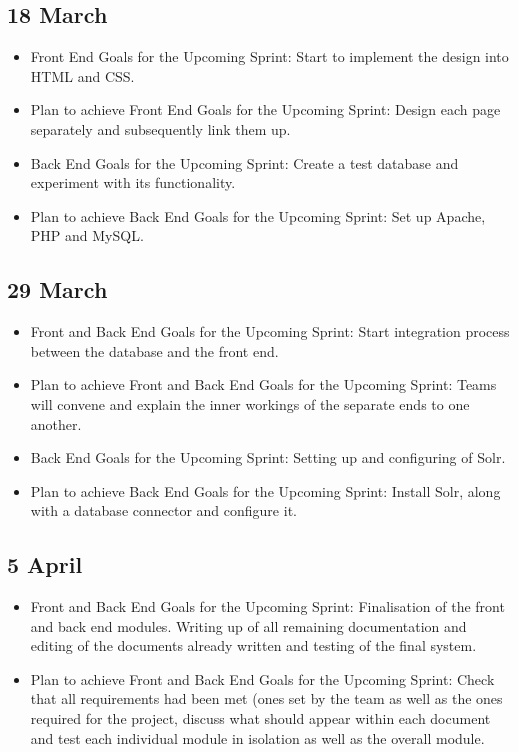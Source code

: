 \documentclass[journal,comsoc,onecolumn]{IEEEtran}
\begin{document}

\subsection{18 March}

\begin{itemize}
	\item Front End Goals for the Upcoming Sprint: Start to implement the design into HTML and CSS.
	\item Plan to achieve Front End Goals for the Upcoming Sprint: Design each page separately and subsequently link them up.
	\item Back End Goals for the Upcoming Sprint: Create a test database and experiment with its functionality.
	\item Plan to achieve Back End Goals for the Upcoming Sprint: Set up Apache, PHP and MySQL.
\end{itemize}


\subsection{29 March}

\begin{itemize}
	\item Front and Back End Goals for the Upcoming Sprint: Start integration process between the database and the front end.
	\item Plan to achieve Front and Back End Goals for the Upcoming Sprint: Teams will convene and explain the inner workings of the separate ends to one another.
	\item Back End Goals for the Upcoming Sprint: Setting up and configuring of Solr.
	\item Plan to achieve Back End Goals for the Upcoming Sprint: Install Solr, along with a database connector and configure it.
\end{itemize}


\subsection{5 April}

\begin{itemize}
	\item Front and Back End Goals for the Upcoming Sprint: Finalisation of the front and back end modules. Writing up of all remaining documentation and editing of the documents already written and testing of the final system.
	\item Plan to achieve Front and Back End Goals for the Upcoming Sprint: Check that all requirements had been met (ones set by the team as well as the ones required for the project, discuss what should appear within each document and test each individual module in isolation as well as the overall module. 
\end{itemize}

\end{document}
